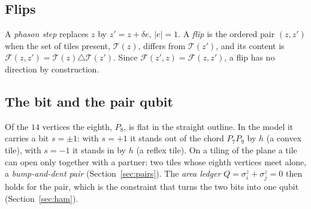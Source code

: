 \documentclass[11pt]{article}
\theoremstyle{definition}
\begin{document}
\subsection{Flips}
A \emph{phason step} replaces $z$ by $z'=z+\delta e$, $|e|=1$. A \emph{flip} is the ordered pair $(z,z')$ when the set of tiles present, $\mathcal{T}(z)$, differs from $\mathcal{T}(z')$, and its content is $\mathcal{F}(z,z')=\mathcal{T}(z)\triangle\mathcal{T}(z')$. Since $\mathcal{F}(z',z)=\mathcal{F}(z,z')$, a flip has no direction by construction.

\subsection{The bit and the pair qubit}\label{sec:bit}
Of the $14$ vertices the eighth, $P_8$, is flat in the straight outline. In the model it carries a bit $s=\pm1$: with $s=+1$ it stands out of the chord $P_7P_9$ by $h$ (a convex tile), with $s=-1$ it stands in by $h$ (a reflex tile). On a tiling of the plane a tile can open only together with a partner: two tiles whose eighth vertices meet alone, a \emph{bump-and-dent pair} (Section~\ref{sec:pairs}). The \emph{area ledger} $Q=\sigma^z_i+\sigma^z_j=0$ then holds for the pair, which is the constraint that turns the two bits into one qubit (Section~\ref{sec:ham}).

\end{document}
